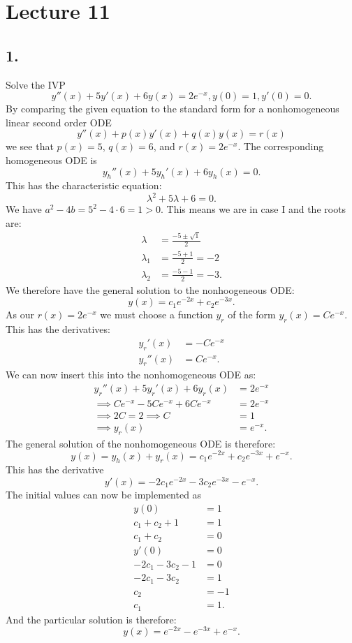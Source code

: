 \section*{Lecture 11}

\subsection*{1.} Solve the IVP
\[ 
y''(x) + 5y'(x) + 6y(x) = 2e^{-x}, y(0) = 1, y'(0) = 0
.\]
\bigbreak
By comparing the given equation to the standard form for a nonhomogeneous linear second order ODE
\[ 
y''(x) + p(x)y'(x) + q(x) y(x) = r(x) 
\]
we see that $p(x) = 5$, $q(x) = 6$, and $r(x) = 2e^{-x}$. The corresponding homogeneous ODE is
\[ 
y_h''(x) + 5y_h'(x) + 6y_h(x) = 0
.\]
This has the characteristic equation:
\[ 
\lambda^2 + 5\lambda + 6 = 0
.\]
We have $a^2 - 4b = 5^2 - 4 \cdot 6 = 1 > 0$. This means we are in case I and the roots are:
\begin{align*}
  \lambda &= \frac{-5 \pm \sqrt{1}}{2} \\
  \lambda_1 &= \frac{-5 + 1}{2} = -2 \\
  \lambda_2 &= \frac{-5 - 1}{2} = -3
.\end{align*}
We therefore have the general solution to the nonhoogeneous ODE:
\[ 
y(x) = c_1 e^{-2x} + c_2 e^{-3x}
.\]
As our $r(x) = 2e^{-x}$ we must choose a function $y_r$ of the form $y_r(x) = C e^{-x}$. This has the derivatives:
\begin{align*}
  y_r'(x) &= -C e^{-x} \\
  y_r''(x) &= C e^{-x}
.\end{align*}
We can now insert this into the nonhomogeneous ODE as:
\begin{align*}
  y_r''(x) + 5y_r'(x) + 6y_r(x) &= 2e^{-x} \\
  \implies C e^{-x} - 5 C e^{-x} + 6 C e^{-x} &= 2e^{-x} \\
  \implies 2C = 2 \implies C &= 1 \\
  \implies y_r(x) &= e^{-x}
.\end{align*}
The general solution of the nonhomogeneous ODE is therefore:
\[ 
y(x) = y_h(x) + y_r (x) = c_1 e^{-2x} + c_2 e^{-3x} + e^{-x}
.\]
This has the derivative
\[
  y'(x) = -2 c_1 e^{-2x} - 3 c_2 e^{-3x} - e^{-x}
.\]
The initial values can now be implemented as
\begin{align*}
  y(0) &= 1 \\
  c_1 + c_2 + 1 &= 1 \\
  c_1 + c_2 &= 0 \\
  y'(0) &= 0 \\
  -2c_1 - 3c_2 - 1 &= 0 \\
  -2c_1 - 3c_2 &= 1 \\
  c_2 &= -1 \\
  c_1 &= 1
.\end{align*}
And the particular solution is therefore:
\[ 
y(x) = e^{-2x} - e^{-3x} + e^{-x}
.\]



